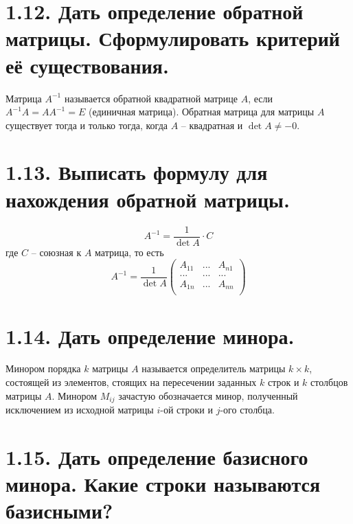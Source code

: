 \documentclass{article}
\begin{document}
\section*{\LARGE 1.12. Дать определение обратной матрицы. Сформулировать критерий её существования. }

Матрица $A^{-1}$ называется обратной квадратной матрице $A$, если $A^{-1}A = AA^{-1} = E$ (единичная матрица). Обратная матрица для матрицы $A$ существует тогда и только тогда, когда $A$ -- квадратная и $\det{A} \ne -0$.

\section*{\LARGE 1.13. Выписать формулу для нахождения обратной матрицы. }

$$
A^{-1} = \frac{1}{\det{A}}\cdot C
$$
где $C$ -- союзная к $A$ матрица, то есть 
$$
A^{-1} = \frac{1}{\det{A}}
\begin{pmatrix}
A_{11} & ... & A_{n1} \\
... & ... & ... \\
A_{1n} & ... & A_{nn} \\
\end{pmatrix}
$$

\section*{\LARGE 1.14. Дать определение минора. }

Минором порядка $k$ матрицы $A$ называется определитель матрицы $k \times k$, состоящей из элементов, стоящих на пересечении заданных $k$ строк и $k$ столбцов матрицы $A$.
\newline Минором $M_{ij}$ зачастую обозначается минор, полученный исключением из исходной матрицы $i$-ой строки и $j$-ого столбца. 

\section*{\LARGE 1.15. Дать определение базисного минора. Какие строки называются базисными?  }
\end{document}
